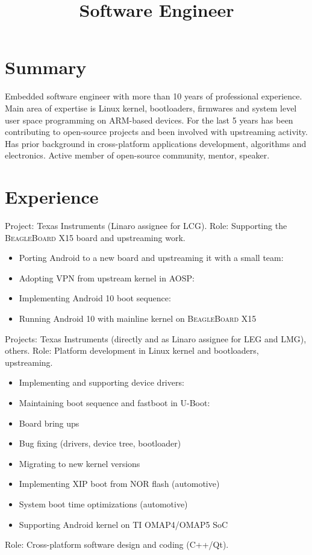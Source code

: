 \documentclass[11pt,a4paper]{moderncv}
\title{Software Engineer}
\begin{document}
\renewcommand*{\bibliographyhead}[1]{}

\maketitle

\section{Summary}

Embedded software engineer with more than 10 years of professional experience.
Main area of expertise is Linux kernel, bootloaders, firmwares and system level
user space programming on ARM-based devices. For the last 5 years has been
contributing to open-source projects and been involved with upstreaming
activity. Has prior background in cross-platform applications development,
algorithms and electronics. Active member of open-source community, mentor,
speaker.

\section{Experience}
  {Project: Texas Instruments (Linaro assignee for LCG). \newline{}
   Role: Supporting the \textsc{BeagleBoard X15} board and upstreaming work.
   \begin{itemize}
     \item Porting Android to a new board and upstreaming it with a small team:
           \cite{a}
     \item Adopting VPN from upstream kernel in AOSP: \cite{b}
     \item Implementing Android 10 boot sequence: \cite{c}
     \item Running Android 10 with mainline kernel on \textsc{BeagleBoard X15}
   \end{itemize}}
  {Projects: Texas Instruments (directly and as Linaro assignee for LEG and
   LMG), others. \newline{}
   Role: Platform development in Linux kernel and bootloaders, upstreaming.
   \begin{itemize}
     \item Implementing and supporting device drivers: \cite{d}
     \item Maintaining boot sequence and fastboot in U-Boot: \cite{e}
     \item Board bring ups
     \item Bug fixing (drivers, device tree, bootloader)
     \item Migrating to new kernel versions
     \item Implementing XIP boot from NOR flash (automotive)
     \item System boot time optimizations (automotive)
     \item Supporting Android kernel on TI OMAP4/OMAP5 SoC
   \end{itemize}
  }
  {Role: Cross-platform software design and coding (C++/Qt).}
\end{document}
